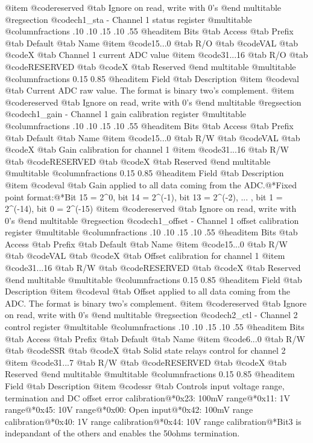 @item @code{reserved} @tab Ignore on read, write with 0's
@end multitable
@regsection @code{ch1_sta} - Channel 1 status register
@multitable @columnfractions .10 .10 .15 .10 .55
@headitem Bits @tab Access @tab Prefix @tab Default @tab Name
@item @code{15...0}
@tab R/O @tab
@code{VAL}
@tab @code{X} @tab 
Channel 1 current ADC value
@item @code{31...16}
@tab R/O @tab
@code{RESERVED}
@tab @code{X} @tab 
Reserved
@end multitable
@multitable @columnfractions 0.15 0.85
@headitem Field @tab Description
@item @code{val} @tab Current ADC raw value. The format is binary two's complement.
@item @code{reserved} @tab Ignore on read, write with 0's
@end multitable
@regsection @code{ch1_gain} - Channel 1 gain calibration register
@multitable @columnfractions .10 .10 .15 .10 .55
@headitem Bits @tab Access @tab Prefix @tab Default @tab Name
@item @code{15...0}
@tab R/W @tab
@code{VAL}
@tab @code{X} @tab 
Gain calibration for channel 1
@item @code{31...16}
@tab R/W @tab
@code{RESERVED}
@tab @code{X} @tab 
Reserved
@end multitable
@multitable @columnfractions 0.15 0.85
@headitem Field @tab Description
@item @code{val} @tab Gain applied to all data coming from the ADC.@*Fixed point format:@*Bit 15 = 2^0, bit 14 = 2^(-1), bit 13 = 2^(-2), ... , bit 1 = 2^(-14), bit 0 = 2^(-15)
@item @code{reserved} @tab Ignore on read, write with 0's
@end multitable
@regsection @code{ch1_offset} - Channel 1 offset calibration register
@multitable @columnfractions .10 .10 .15 .10 .55
@headitem Bits @tab Access @tab Prefix @tab Default @tab Name
@item @code{15...0}
@tab R/W @tab
@code{VAL}
@tab @code{X} @tab 
Offset calibration for channel 1
@item @code{31...16}
@tab R/W @tab
@code{RESERVED}
@tab @code{X} @tab 
Reserved
@end multitable
@multitable @columnfractions 0.15 0.85
@headitem Field @tab Description
@item @code{val} @tab Offset applied to all data coming from the ADC. The format is binary two's complement.
@item @code{reserved} @tab Ignore on read, write with 0's
@end multitable
@regsection @code{ch2_ctl} - Channel 2 control register
@multitable @columnfractions .10 .10 .15 .10 .55
@headitem Bits @tab Access @tab Prefix @tab Default @tab Name
@item @code{6...0}
@tab R/W @tab
@code{SSR}
@tab @code{X} @tab 
Solid state relays control for channel 2
@item @code{31...7}
@tab R/W @tab
@code{RESERVED}
@tab @code{X} @tab 
Reserved
@end multitable
@multitable @columnfractions 0.15 0.85
@headitem Field @tab Description
@item @code{ssr} @tab Controls input voltage range, termination and DC offset error calibration@*0x23: 100mV range@*0x11: 1V range@*0x45: 10V range@*0x00: Open input@*0x42: 100mV range calibration@*0x40: 1V range calibration@*0x44: 10V range calibration@*Bit3 is indepandant of the others and enables the 50ohms termination.
